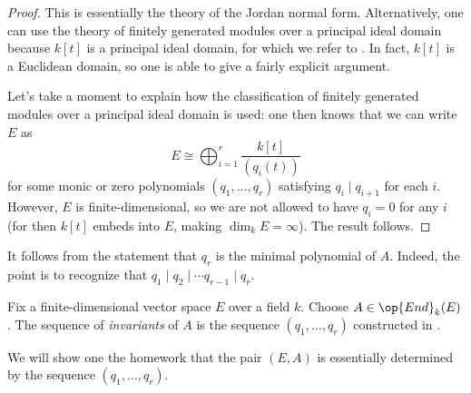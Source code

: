 \documentclass[../notes.tex]{subfiles}
\begin{document}
\begin{proof}
	This is essentially the theory of the Jordan normal form. Alternatively, one can use the theory of finitely generated modules over a principal ideal domain because $k[t]$ is a principal ideal domain, for which we refer to \cite[Theorem~III.7.7]{lang-algebra}. In fact, $k[t]$ is a Euclidean domain, so one is able to give a fairly explicit argument.

	Let's take a moment to explain how the classification of finitely generated modules over a principal ideal domain is used: one then knows that we can write $E$ as
	\[E\cong\bigoplus_{i=1}^r\frac{k[t]}{(q_i(t))}\]
	for some monic or zero polynomials $(q_1,\ldots,q_r)$ satisfying $q_i\mid q_{i+1}$ for each $i$. However, $E$ is finite-dimen\-sional, so we are not allowed to have $q_i=0$ for any $i$ (for then $k[t]$ embeds into $E$, making $\dim_kE=\infty$). The result follows.
\end{proof}
\begin{remark}
	It follows from the statement that $q_r$ is the minimal polynomial of $A$. Indeed, the point is to recognize that $q_1\mid q_2\mid\cdots q_{r-1}\mid q_r$.
\end{remark}
\begin{definition}[invariants]
	Fix a finite-dimensional vector space $E$ over a field $k$. Choose $A\in\op{End}_k(E)$. The sequence of \textit{invariants} of $A$ is the sequence $(q_1,\ldots,q_r)$ constructed in .
\end{definition}
We will show one the homework that the pair $(E,A)$ is essentially determined by the sequence $(q_1,\ldots,q_r)$.
\end{document}
